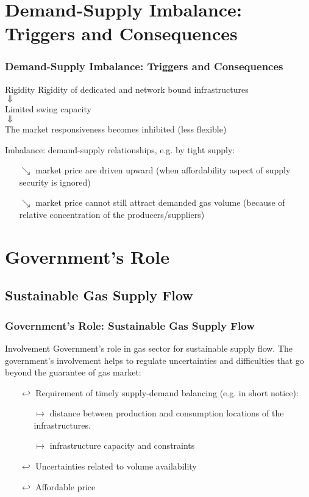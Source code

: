 \documentclass[pdflatex,compress,10pt,
	xcolor={dvipsnames,dvipsnames,svgnames,x11names,table},
	hyperref={
	colorlinks = true,
	breaklinks = true, 
	citecolor=NavyBlue, 
	urlcolor = blue, 
	filecolor=magenta} 
]{beamer}
\begin{document}
\section{Demand-Supply Imbalance: Triggers and Consequences}
\begin{frame}\frametitle{ Demand-Supply Imbalance: Triggers and Consequences}

\begin{alertblock}{Rigidity}
Rigidity of dedicated and network bound \alert{infrastructures}\\
$\Downarrow$\\
Limited \alert{swing capacity}\\
$\Downarrow$\\
The market responsiveness becomes \alert{inhibited (less flexible)}
\end{alertblock}

\begin{examples}{Imbalance:}
demand-supply relationships, e.g. by tight supply: 
\begin{itemize}
	\item [$\searrow$]market price are driven upward (when affordability aspect of supply security is ignored)
	\item [$\searrow$]market price cannot still attract demanded gas volume (because of relative concentration of the producers/suppliers)
\end{itemize}
\end{examples}
\end{frame}

\section{Government’s Role}
\subsection{Sustainable Gas Supply Flow}
\begin{frame}\frametitle{Government’s Role: Sustainable Gas Supply Flow}

\begin{alertblock}{Involvement}
Government’s role in gas sector for sustainable supply flow. The government's involvement helps to regulate uncertainties and difficulties that go beyond the guarantee of gas market:
\begin{itemize}
	\item [$\hookleftarrow$] Requirement of timely supply-demand balancing (e.g. in short notice):
		\begin{itemize}
			\item [$\longmapsto$] distance between production and consumption locations of the infrastructures.
			\item [$\longmapsto$] infrastructure capacity and constraints
		\end{itemize}
	\item [$\hookleftarrow$] Uncertainties related to volume availability
	\item[$\hookleftarrow$]  Affordable price
\end{itemize}
\end{alertblock}
\end{frame}
\end{document}
